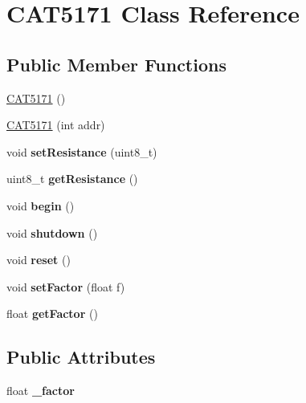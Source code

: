 \hypertarget{class_c_a_t5171}{\section{C\-A\-T5171 Class Reference}
\label{class_c_a_t5171}
}
\subsection*{Public Member Functions}
\begin{DoxyCompactItemize}
\item 
\hyperlink{class_c_a_t5171_a50d0d623ce541db0b530723bd459c212}{C\-A\-T5171} ()
\item 
\hyperlink{class_c_a_t5171_a56d0b142b876317a6bd7bea6ce297c9a}{C\-A\-T5171} (int addr)
\item 
\hypertarget{class_c_a_t5171_a169df28d0459dd762a84781dad18f047}{void {\bfseries set\-Resistance} (uint8\-\_\-t)}\label{class_c_a_t5171_a169df28d0459dd762a84781dad18f047}

\item 
\hypertarget{class_c_a_t5171_afb439488256cc204cc913d5b08cc307c}{uint8\-\_\-t {\bfseries get\-Resistance} ()}\label{class_c_a_t5171_afb439488256cc204cc913d5b08cc307c}

\item 
\hypertarget{class_c_a_t5171_a83bb9c350e9cb504b1a1a811a1c4906d}{void {\bfseries begin} ()}\label{class_c_a_t5171_a83bb9c350e9cb504b1a1a811a1c4906d}

\item 
\hypertarget{class_c_a_t5171_ae108ba39c1a26f9541050d5c29d90b68}{void {\bfseries shutdown} ()}\label{class_c_a_t5171_ae108ba39c1a26f9541050d5c29d90b68}

\item 
\hypertarget{class_c_a_t5171_ac21bd2618a96dc33460bc11e1be0c014}{void {\bfseries reset} ()}\label{class_c_a_t5171_ac21bd2618a96dc33460bc11e1be0c014}

\item 
\hypertarget{class_c_a_t5171_adc7ef5b74a244221005f45468a7edaae}{void {\bfseries set\-Factor} (float f)}\label{class_c_a_t5171_adc7ef5b74a244221005f45468a7edaae}

\item 
\hypertarget{class_c_a_t5171_abe9c498f8359a3d05457c16b07049882}{float {\bfseries get\-Factor} ()}\label{class_c_a_t5171_abe9c498f8359a3d05457c16b07049882}

\end{DoxyCompactItemize}
\subsection*{Public Attributes}
\begin{DoxyCompactItemize}
\item 
\hypertarget{class_c_a_t5171_aa9089da005d31010f73a4d95c0ec831b}{float {\bfseries \-\_\-factor}}\label{class_c_a_t5171_aa9089da005d31010f73a4d95c0ec831b}

\end{DoxyCompactItemize}


